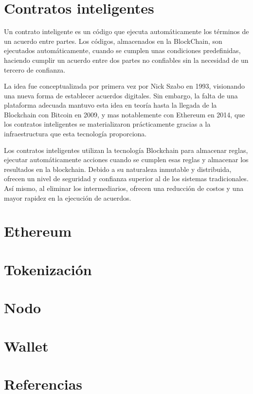 \section{Contratos inteligentes}

Un contrato inteligente es un código que ejecuta automáticamente los términos de un acuerdo entre partes. Los códigos, almacenados en la BlockChain, son ejecutados automáticamente, cuando se cumplen unas condiciones predefinidas, haciendo cumplir un acuerdo entre dos partes no confiables sin la necesidad de un tercero de confianza.

La idea fue conceptualizada por primera vez por Nick Szabo en 1993, visionando una nueva forma de establecer acuerdos digitales. Sin embargo, la falta de una plataforma adecuada mantuvo esta idea en teoría hasta la llegada de la Blockchain con Bitcoin en 2009, y mas notablemente con Ethereum en 2014, que los contratos inteligentes se materializaron prácticamente gracias a la infraestructura que esta tecnología proporciona.

Los contratos inteligentes utilizan la tecnología Blockchain para almacenar reglas, ejecutar automáticamente acciones cuando se cumplen esas reglas y almacenar los resultados en la blockchain. Debido a su naturaleza inmutable y distribuida, ofrecen un nivel de seguridad y confianza superior al de los sistemas tradicionales. Así mismo, al eliminar los intermediarios, ofrecen una reducción de costos y una mayor rapidez en la ejecución de acuerdos.


\section{Ethereum}


\section{Tokenización}


\section{Nodo}


\section{Wallet}


\section{Referencias}

